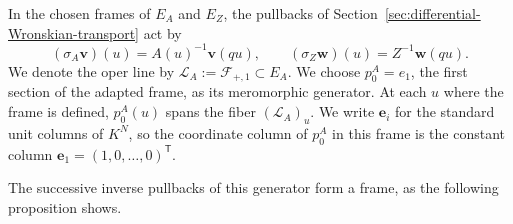 \documentclass[11pt,leqno]{amsart}
\numberwithin{equation}{section}
\theoremstyle{plain}
\theoremstyle{definition}
\theoremstyle{plain}
\theoremstyle{definition}
\theoremstyle{remark}
\begin{document}
In the chosen frames of $E_A$ and $E_Z$, the pullbacks of Section~\ref{sec:differential-Wronskian-transport} act by
\begin{equation}\label{eq:typeA-semilinear-shifts}
 (\sigma_A\mathbf v)(u)=A(u)^{-1}\mathbf v(qu),
 \qquad
 (\sigma_Z\mathbf w)(u)=Z^{-1}\mathbf w(qu).
\end{equation}
We denote the oper line by $\mathcal L_A:=\mathcal F_{+,1}\subset E_A$. We choose $p_0^A=e_1$, the first section of the adapted frame, as its meromorphic generator. At each $u$ where the frame is defined, $p_0^A(u)$ spans the fiber $(\mathcal L_A)_u$. We write $\mathbf e_i$ for the standard unit columns of $K^N$, so the coordinate column of $p_0^A$ in this frame is the constant column $\mathbf e_1=(1,0,\ldots,0)^{\mathsf T}$.

The successive inverse pullbacks of this generator form a frame, as the following proposition shows.
\end{document}
